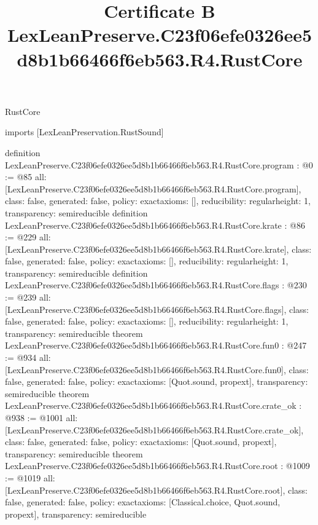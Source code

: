\begin{lexlean}{RustCore}
\title{Certificate B LexLeanPreserve.C23f06efe0326ee5d8b1b66466f6eb563.R4.RustCore}
\begin{coremodule}
imports [LexLeanPreservation.RustSound]

definition LexLeanPreserve.C23f06efe0326ee5d8b1b66466f6eb563.R4.RustCore.program : @0 := @85 {
  all: [LexLeanPreserve.C23f06efe0326ee5d8b1b66466f6eb563.R4.RustCore.program],
  class: false,
  generated: false,
  policy: exact{axioms: []},
  reducibility: regular{height: 1},
  transparency: semireducible
}
definition LexLeanPreserve.C23f06efe0326ee5d8b1b66466f6eb563.R4.RustCore.krate : @86 := @229 {
  all: [LexLeanPreserve.C23f06efe0326ee5d8b1b66466f6eb563.R4.RustCore.krate],
  class: false,
  generated: false,
  policy: exact{axioms: []},
  reducibility: regular{height: 1},
  transparency: semireducible
}
definition LexLeanPreserve.C23f06efe0326ee5d8b1b66466f6eb563.R4.RustCore.flags : @230 := @239 {
  all: [LexLeanPreserve.C23f06efe0326ee5d8b1b66466f6eb563.R4.RustCore.flags],
  class: false,
  generated: false,
  policy: exact{axioms: []},
  reducibility: regular{height: 1},
  transparency: semireducible
}
theorem LexLeanPreserve.C23f06efe0326ee5d8b1b66466f6eb563.R4.RustCore.fun0 : @247 := @934 {
  all: [LexLeanPreserve.C23f06efe0326ee5d8b1b66466f6eb563.R4.RustCore.fun0],
  class: false,
  generated: false,
  policy: exact{axioms: [Quot.sound, propext]},
  transparency: semireducible
}
theorem LexLeanPreserve.C23f06efe0326ee5d8b1b66466f6eb563.R4.RustCore.crate_ok : @938 := @1001 {
  all: [LexLeanPreserve.C23f06efe0326ee5d8b1b66466f6eb563.R4.RustCore.crate_ok],
  class: false,
  generated: false,
  policy: exact{axioms: [Quot.sound, propext]},
  transparency: semireducible
}
theorem LexLeanPreserve.C23f06efe0326ee5d8b1b66466f6eb563.R4.RustCore.root : @1009 := @1019 {
  all: [LexLeanPreserve.C23f06efe0326ee5d8b1b66466f6eb563.R4.RustCore.root],
  class: false,
  generated: false,
  policy: exact{axioms: [Classical.choice, Quot.sound, propext]},
  transparency: semireducible
}


\end{coremodule}
\end{lexlean}
